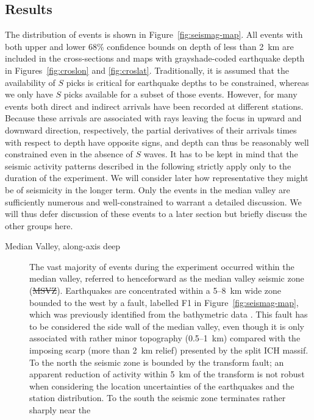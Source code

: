 \documentclass[jgr]{agu2001}
\providecommand{\DIFadd}[1]{{\protect\color{blue}\uwave{#1}}} %
\providecommand{\DIFdel}[1]{{\protect\color{red}\sout{#1}}}                      %
\providecommand{\DIFaddbegin}{} %
\providecommand{\DIFaddend}{} %
\providecommand{\DIFdelbegin}{} %
\providecommand{\DIFdelend}{} %
\begin{document}
\begin{article}
\subsection{Results}

The distribution of events is shown in
Figure~\ref{fig:seismag-map}. All events with both upper
and lower 68\% confidence bounds on depth of less than 2~km are
included in the cross-sections and maps with grayshade-coded earthquake
depth in Figures~\ref{fig:croslon} and \ref{fig:croslat}.
Traditionally, it is assumed that the availability of $S$ picks is
critical for earthquake depths to be constrained, whereas we only have
$S$ picks available for a subset of those events.  However, for many
events both direct and indirect arrivals have been recorded at
different stations.  Because these arrivals are associated with rays leaving
the focus in upward and downward direction, respectively, the
partial derivatives of their arrivals times with respect to depth have
opposite signs, and depth can thus be reasonably well constrained even
in the absence of $S$ waves.
It has to be kept in mind that the seismic activity patterns described
in the following strictly apply only to the duration of the
experiment. We will consider later how representative they might be of
seismicity in the longer term.  Only the events in the median valley
are sufficiently numerous and well-constrained to warrant a detailed
discussion.  We will thus defer discussion of these events to a later
section but briefly discuss the other groups here.
\begin{description}
\item[Median Valley, along-axis deep]  The vast majority of events during the
experiment occurred within the median valley, referred to henceforward
as the median valley seismic zone (\DIFdelbegin \DIFdel{MSVZ}\DIFdelend \DIFaddbegin \DIFadd{MVSZ}\DIFaddend ).  Earthquakes are
concentrated within a 5--8~km wide zone bounded to the west by a
fault, labelled F1 in Figure~\ref{fig:seismag-map}, which was
previously identified from the bathymetric data \citep{reston02}.
This fault has to be considered the side wall of the median
valley, even though it is only associated with rather minor topography
(0.5--1~km) compared with the imposing scarp (more than 2~km relief)
presented by the split ICH massif.  To the north the seismic zone is
bounded by the transform fault; an apparent reduction of activity
within 5~km of the transform is not robust when considering the
location uncertainties of the earthquakes and the station
distribution. To the south the seismic zone terminates rather sharply near the

\end{description}
\end{article}
\end{document}
